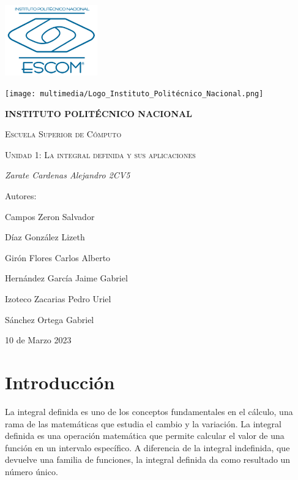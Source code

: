 \documentclass{article}
\begin{document}
\begin{titlepage}
  {\includegraphics[width=0.3\textwidth]{multimedia/ESCOM-Logo.png}}
  \hfill
  {\texttt{[image: multimedia/Logo\_Instituto\_Politécnico\_Nacional.png]}\par}
  \vspace{1cm}
  \centering
  {\bfseries\LARGE  INSTITUTO POLIT\'ECNICO NACIONAL\par}
  \vspace{1cm}
  {\scshape\LARGE Escuela Superior de C\'omputo\par}
  \vspace{1cm}
  {\scshape\Huge Unidad 1: La integral definida y sus aplicaciones \par}
  \vspace{2cm}
  {\itshape\Large Zarate Cardenas Alejandro 2CV5\par}
  \vfill
  {\Large Autores:\par}
  {\Large Campos Zeron Salvador\par}
  {\Large Díaz González Lizeth\par}
  {\Large Girón Flores Carlos Alberto\par}
  {\Large Hernández García Jaime Gabriel\par}
  {\Large Izoteco Zacarias Pedro Uriel\par}
  {\Large S\'anchez Ortega Gabriel\par}
  \vfill
  {\Large 10 de Marzo 2023 \par}
\end{titlepage}

\renewcommand*\contentsname{Índice}
\tableofcontents
\newpage
\section{Introducción}

La integral definida es uno de los conceptos fundamentales en el cálculo, una rama de las matemáticas que estudia el cambio y la variación. La integral definida es una operación matemática que permite calcular el valor de una función en un intervalo específico. A diferencia de la integral indefinida, que devuelve una familia de funciones, la integral definida da como resultado un número único.
\end{document}
